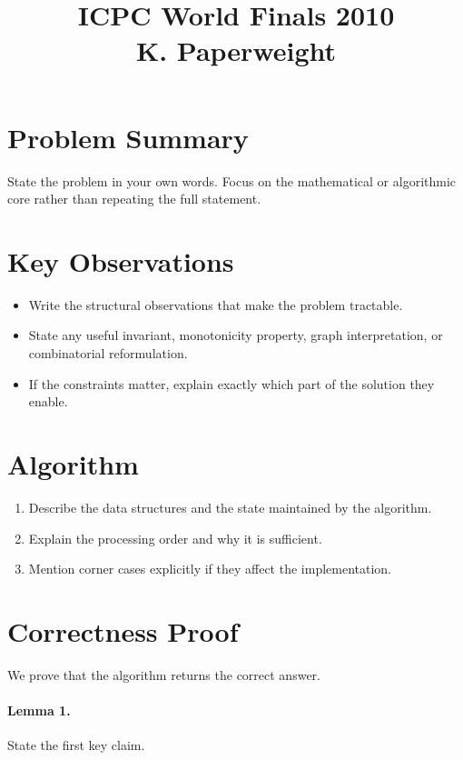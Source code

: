 \documentclass[11pt]{article}
\title{ICPC World Finals 2010\\K. Paperweight}
\author{}
\date{}
\begin{document}
\maketitle

\section*{Problem Summary}

State the problem in your own words. Focus on the mathematical or algorithmic core rather than repeating the full statement.

\section*{Key Observations}

\begin{itemize}[leftmargin=*]
    \item Write the structural observations that make the problem tractable.
    \item State any useful invariant, monotonicity property, graph interpretation, or combinatorial reformulation.
    \item If the constraints matter, explain exactly which part of the solution they enable.
\end{itemize}

\section*{Algorithm}

\begin{enumerate}[leftmargin=*]
    \item Describe the data structures and the state maintained by the algorithm.
    \item Explain the processing order and why it is sufficient.
    \item Mention corner cases explicitly if they affect the implementation.
\end{enumerate}

\section*{Correctness Proof}

We prove that the algorithm returns the correct answer.

\paragraph{Lemma 1.}
State the first key claim.
\end{document}
